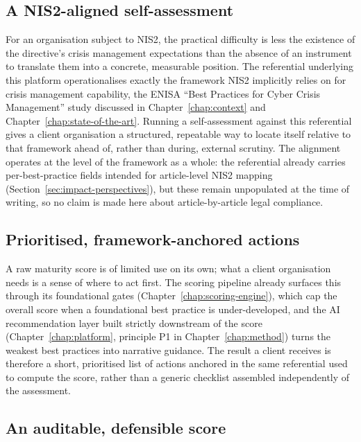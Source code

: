 \subsection{A NIS2-aligned self-assessment}
\label{sec:impact-clients-nis2-alignment}

For an organisation subject to NIS2, the practical difficulty is less the existence of the directive's crisis management expectations than the absence of an instrument to translate them into a concrete, measurable position. The referential underlying this platform operationalises exactly the framework NIS2 implicitly relies on for crisis management capability, the ENISA ``Best Practices for Cyber Crisis Management'' study discussed in Chapter~\ref{chap:context} and Chapter~\ref{chap:state-of-the-art}. Running a self-assessment against this referential gives a client organisation a structured, repeatable way to locate itself relative to that framework ahead of, rather than during, external scrutiny. The alignment operates at the level of the framework as a whole: the referential already carries per-best-practice fields intended for article-level NIS2 mapping (Section~\ref{sec:impact-perspectives}), but these remain unpopulated at the time of writing, so no claim is made here about article-by-article legal compliance.

\subsection{Prioritised, framework-anchored actions}
\label{sec:impact-clients-prioritised-actions}

A raw maturity score is of limited use on its own; what a client organisation needs is a sense of where to act first. The scoring pipeline already surfaces this through its foundational gates (Chapter~\ref{chap:scoring-engine}), which cap the overall score when a foundational best practice is under-developed, and the AI recommendation layer built strictly downstream of the score (Chapter~\ref{chap:platform}, principle P1 in Chapter~\ref{chap:method}) turns the weakest best practices into narrative guidance. The result a client receives is therefore a short, prioritised list of actions anchored in the same referential used to compute the score, rather than a generic checklist assembled independently of the assessment.

\subsection{An auditable, defensible score}
\label{sec:impact-clients-auditable-score}


